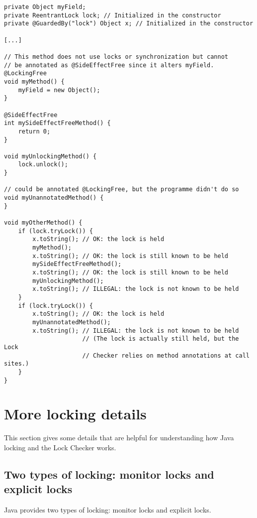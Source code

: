 \begin{verbatim}
private Object myField;
private ReentrantLock lock; // Initialized in the constructor
private @GuardedBy("lock") Object x; // Initialized in the constructor

[...]

// This method does not use locks or synchronization but cannot
// be annotated as @SideEffectFree since it alters myField.
@LockingFree
void myMethod() {
    myField = new Object();
}

@SideEffectFree
int mySideEffectFreeMethod() {
    return 0;
}

void myUnlockingMethod() {
    lock.unlock();
}

// could be annotated @LockingFree, but the programme didn't do so
void myUnannotatedMethod() {
}

void myOtherMethod() {
    if (lock.tryLock()) {
        x.toString(); // OK: the lock is held
        myMethod();
        x.toString(); // OK: the lock is still known to be held
        mySideEffectFreeMethod();
        x.toString(); // OK: the lock is still known to be held
        myUnlockingMethod();
        x.toString(); // ILLEGAL: the lock is not known to be held
    }
    if (lock.tryLock()) {
        x.toString(); // OK: the lock is held
        myUnannotatedMethod();
        x.toString(); // ILLEGAL: the lock is not known to be held
                      // (The lock is actually still held, but the Lock
                      // Checker relies on method annotations at call sites.)
    }
}
\end{verbatim}




\section{More locking details\label{lock-details}}

This section gives some details that are helpful for understanding how Java
locking and the Lock Checker works.

\subsection{Two types of locking:  monitor locks and explicit locks\label{lock-two-types}}

Java provides two types of locking:  monitor locks and explicit locks.

